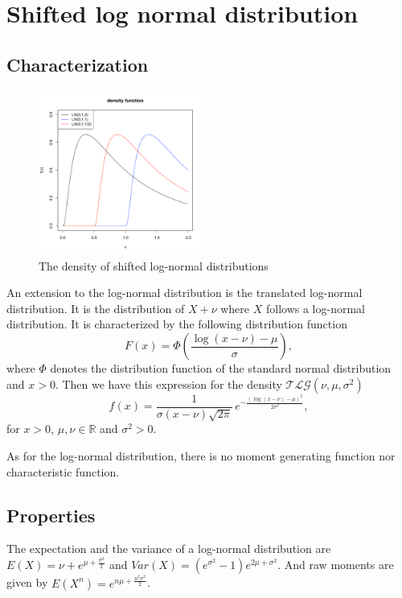\newpage\section{Shifted log normal distribution}
\subsection{Characterization}
\begin{figure}
  \vspace{-20pt}
  \begin{center}
    \includegraphics[width=0.48\textwidth]{img/shiftlognormzoom}
  \end{center}
  \vspace{-20pt}
  \caption{The density of shifted log-normal distributions}
  \vspace{-20pt}
\end{figure}
An extension to the log-normal distribution is the translated log-normal distribution. It is
the distribution of $X+\nu$ where $X$ follows a log-normal distribution.
It is characterized by the following distribution function
$$
F(x) = \Phi\left(\frac{\log(x-\nu)-\mu}{\sigma}\right),
$$
where $\Phi$ denotes the distribution function of the standard normal distribution and $x>0$.
Then we have this expression for the density $\mathcal T\mathcal L \mathcal G(\nu,\mu,\sigma^2)$
$$
f(x) =  \frac{1}{\sigma (x-\nu) \sqrt{2\pi}} \,e^{ -\frac{(\log(x-\nu)- \mu)^2}{2\sigma^2}},
$$
for $x>0$, $\mu,\nu\in\mathbb R$ and $\sigma^2 >0$.

As for the log-normal distribution, there is no moment generating function nor characteristic function.

\subsection{Properties}
The expectation and the variance of a log-normal distribution are $E(X) =\nu+ e^{\mu+\frac{\sigma^2}{2}}$ and $Var(X) = (e^{\sigma^2}-1)e^{2\mu+\sigma^2}$. And raw moments are given by $E(X^n) = e^{n\mu + \frac{n^2\sigma^2}{2}}$. 

